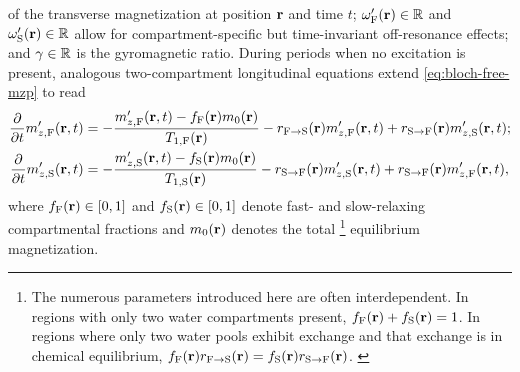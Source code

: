 of the transverse magnetization
at position $\mathbf{r}$ 
and time $t$; 
$\ompf\pr \in \real$ and $\omps\pr \in \real$ 
allow for compartment-specific 
but time-invariant off-resonance effects;
and $\gamma \in \mathbb{R}$ is the gyromagnetic ratio.
During periods when no excitation is present,
analogous two-compartment longitudinal equations 
extend \eqref{eq:bloch-free-mzp} to read
\begin{align}
	\dela{t} \mzpf\prt &=
		-\frac{\mzpf\prt - \ff\pr\mzero\pr}{\tf{1}\pr} 
		- \rfs\pr \mzpf\prt + \rsf\pr \mzps\prt;
		\label{eq:mwf,mz-f} \\
	\dela{t} \mzps\prt &= 
		-\frac{\mzps\prt - \fs\pr\mzero\pr}{\ts{1}\pr}
		- \rsf\pr \mzps\prt + \rsf\pr \mzpf\prt,
		\label{eq:mwf,mz-s}
\end{align}
where $\ff\pr \in \brac{0,1}$ and $\fs\pr \in \brac{0,1}$ 
denote fast- and slow-relaxing
compartmental fractions
and $\mzero\pr$ denotes the total 
\footnote{The numerous parameters introduced here
	are often interdependent. 
	In regions with only two water compartments present,
	$\ff\pr + \fs\pr = 1$.
	In regions where only two water pools exhibit exchange 
	and that exchange is in chemical equilibrium,
	$\ff\pr \rfs\pr = \fs\pr \rsf\pr$.
	\label{foot:constraint}
}
equilibrium magnetization.
 
